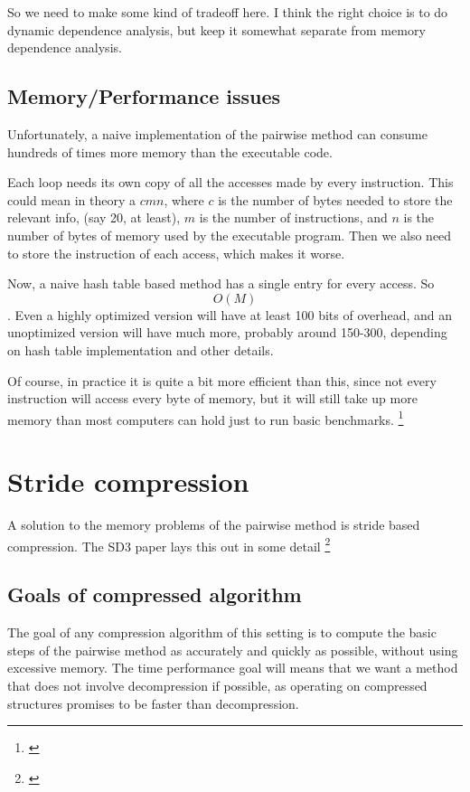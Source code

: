 \documentclass[12pt,twoside]{reedthesis}
\begin{document}
		So we need to make some kind of tradeoff here. I think the right choice is to do dynamic dependence analysis, but keep it somewhat separate from memory dependence analysis.


		\subsection{Memory/Performance issues}

		Unfortunately, a naive implementation of the pairwise method can consume hundreds of times more memory than the executable code.

		Each loop needs its own copy of all the accesses made by every instruction. This could mean in theory a $cmn$, where $c$ is the number of bytes needed to store the relevant info, (say 20, at least), $m$ is the number of instructions, and $n$ is the number of bytes of memory used by the executable program. Then we also need to store the instruction of each access, which makes it worse.
		
		Now, a naive hash table based method has a single entry for every access. 
		So $$O(M)$$. Even a highly optimized version will have at least 100 bits of overhead, and an unoptimized version will have much more, probably around 150-300, depending on hash table implementation and other details. 

		Of course, in practice it is quite a bit more efficient than this, since not every instruction will access every byte of memory, but it will still take up more memory than most computers can hold just to run basic benchmarks. \footnote{\cite{Kim:2010}}

	\section{Stride compression}

		A solution to the memory problems of the pairwise method is stride based compression. The SD3 paper lays this out in some detail \footnote{\cite{Kim:2010}}

		\subsection{Goals of compressed algorithm}
		The goal of any compression algorithm of this setting is to compute the basic steps of the pairwise method as accurately and quickly as possible, without using excessive memory. The time performance goal will means that we want a method that does not involve decompression if possible, as operating on compressed structures promises to be faster than decompression.
\end{document}
